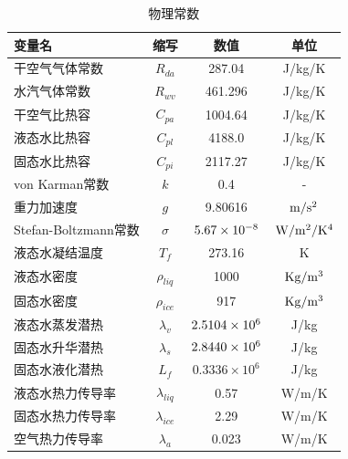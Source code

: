 \begin{table}[]
\centering
\caption{物理常数}
\label{tab:物理常数chap4}
\begin{tabular}{lccc}
\toprule
变量名&缩写&数值&单位 \\\midrule
干空气气体常数            & $R_{da}$                       & 287.04     & J/kg/K  \\ 
水汽气体常数             & $R_{wv}$                       & 461.296     & J/kg/K  \\
干空气比热容             & $C_{pa} $                      & 1004.64    & J/kg/K  \\
液态水比热容             & $C_{pl}$                       & 4188.0     & J/kg/K  \\
固态水比热容             & $C_{pi}$                       & 2117.27    & J/kg/K  \\
von Karman常数       & $k$                               & 0.4        &    -     \\
重力加速度              & $g$                               & 9.80616    & $\rm m/s^2$    \\
Stefan-Boltzmann常数 & $\sigma$           & $5.67\times\rm 10^{-8}$  & $\rm W/m^2/K^4$ \\
液态水凝结温度            & $T_f$                            & 273.16     & K       \\
液态水密度              & $\rho_{liq}$    & 1000       & $\rm Kg/m^3$   \\
固态水密度              & $\rho_{ice}$    & 917        & $\rm Kg/m^3$   \\
液态水蒸发潜热            & $\lambda_v$       & $2.5104\times\rm 10^{6}$ & J/kg    \\
固态水升华潜热            & $\lambda_s$       & $2.8440\times\rm 10^{6}$ & J/kg    \\
固态水液化潜热            & $L_f$                           & $0.3336\times10^6$ & J/kg    \\
液态水热力传导率           & $\lambda_{liq}$ & 0.57       & W/m/K   \\
固态水热力传导率           & $\lambda_{ice}$ & 2.29       & W/m/K   \\
空气热力传导率            & $\lambda_a$       & 0.023      & W/m/K      \\\bottomrule
\end{tabular}
\end{table}



